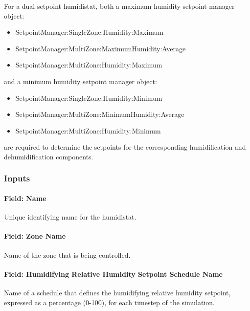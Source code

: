 For a dual setpoint humidistat, both a maximum humidity setpoint manager object:

\begin{itemize}
\item
  SetpointManager:SingleZone:Humidity:Maximum
\item
  SetpointManager:MultiZone:MaximumHumidity:Average
\item
  SetpointManager:MultiZone:Humidity:Maximum
\end{itemize}

and a minimum humidity setpoint manager object:

\begin{itemize}
\item
  SetpointManager:SingleZone:Humidity:Minimum
\item
  SetpointManager:MultiZone:MinimumHumidity:Average
\item
  SetpointManager:MultiZone:Humidity:Minimum
\end{itemize}

are required to determine the setpoints for the corresponding humidification and dehumidification components.

\subsubsection{Inputs}\label{inputs-8-028}

\paragraph{Field: Name}\label{field-name-6-026}

Unique identifying name for the humidistat.

\paragraph{Field: Zone Name}\label{field-zone-name-014}

Name of the zone that is being controlled.

\paragraph{Field: Humidifying Relative Humidity Setpoint Schedule Name}\label{field-humidifying-relative-humidity-setpoint-schedule-name}

Name of a schedule that defines the humidifying relative humidity setpoint, expressed as a percentage (0-100), for each timestep of the simulation.

